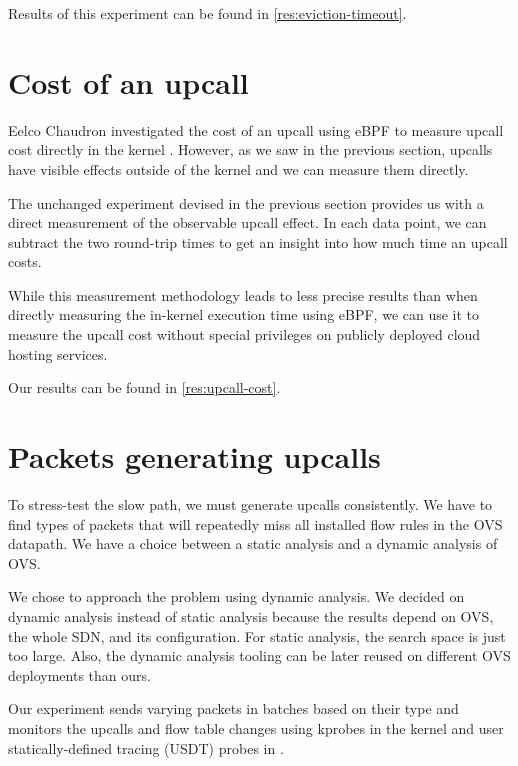 Results of this experiment can be found in \cref{res:eviction-timeout}.

\section{Cost of an upcall}
\label{design:upcall-cost}

Eelco Chaudron investigated the cost of an upcall using eBPF to measure upcall cost directly in the kernel \cite{UpcallCost}. However, as we saw in the previous section, upcalls have visible effects outside of the kernel and we can measure them directly.

The unchanged experiment devised in the previous section provides us with a direct measurement of the observable upcall effect. In each data point, we can subtract the two round-trip times to get an insight into how much time an upcall costs.

While this measurement methodology leads to less precise results than when directly measuring the in-kernel execution time using eBPF, we can use it to measure the upcall cost without special privileges on publicly deployed cloud hosting services.

Our results can be found in \cref{res:upcall-cost}.

\section{Packets generating upcalls}
\label{design:upcall-generators}

To stress-test the slow path, we must generate upcalls consistently. We have to find types of packets that will repeatedly miss all installed flow rules in the OVS datapath. We have a choice between a static analysis and a dynamic analysis of OVS.

We chose to approach the problem using dynamic analysis. We decided on dynamic analysis instead of static analysis because the results depend on OVS, the whole SDN, and its configuration. For static analysis, the search space is just too large. Also, the dynamic analysis tooling can be later reused on different OVS deployments than ours.

Our experiment sends varying packets in batches based on their type and monitors the upcalls and flow table changes using kprobes in the kernel and user statically-defined tracing (USDT) probes in .

